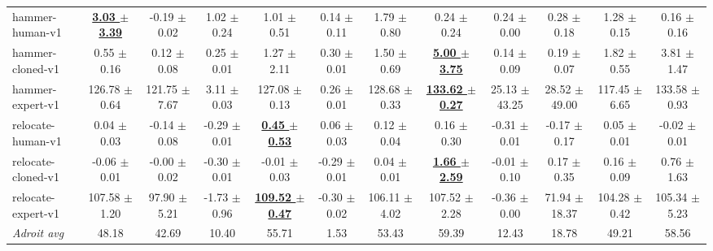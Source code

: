 \documentclass[a4paper]{article}
\begin{document}
\begin{table}[t]
{\begin{tabular}{lccccccccccc}
    hammer-human-v1 & \textbf{\underline{3.03 $\pm$ 3.39}} & -0.19 $\pm$ 0.02 & 1.02 $\pm$ 0.24 & 1.01 $\pm$ 0.51 & 0.14 $\pm$ 0.11 & 1.79 $\pm$ 0.80 & 0.24 $\pm$ 0.24 & 0.24 $\pm$ 0.00 & 0.28 $\pm$ 0.18 & 1.28 $\pm$ 0.15 & 0.16 $\pm$ 0.16 \\
    hammer-cloned-v1 & 0.55 $\pm$ 0.16 & 0.12 $\pm$ 0.08 & 0.25 $\pm$ 0.01 & 1.27 $\pm$ 2.11 & 0.30 $\pm$ 0.01 & 1.50 $\pm$ 0.69 & \textbf{\underline{5.00 $\pm$ 3.75}} & 0.14 $\pm$ 0.09 & 0.19 $\pm$ 0.07 & 1.82 $\pm$ 0.55 & 3.81 $\pm$ 1.47 \\
    hammer-expert-v1 & 126.78 $\pm$ 0.64 & 121.75 $\pm$ 7.67 & 3.11 $\pm$ 0.03 & 127.08 $\pm$ 0.13 & 0.26 $\pm$ 0.01 & 128.68 $\pm$ 0.33 & \textbf{\underline{133.62 $\pm$ 0.27}} & 25.13 $\pm$ 43.25 & 28.52 $\pm$ 49.00 & 117.45 $\pm$ 6.65 & 133.58 $\pm$ 0.93 \\
    relocate-human-v1 & 0.04 $\pm$ 0.03 & -0.14 $\pm$ 0.08 & -0.29 $\pm$ 0.01 & \textbf{\underline{0.45 $\pm$ 0.53}} & 0.06 $\pm$ 0.03 & 0.12 $\pm$ 0.04 & 0.16 $\pm$ 0.30 & -0.31 $\pm$ 0.01 & -0.17 $\pm$ 0.17 & 0.05 $\pm$ 0.01 & -0.02 $\pm$ 0.01 \\
    relocate-cloned-v1 & -0.06 $\pm$ 0.01 & -0.00 $\pm$ 0.02 & -0.30 $\pm$ 0.01 & -0.01 $\pm$ 0.03 & -0.29 $\pm$ 0.01 & 0.04 $\pm$ 0.01 & \textbf{\underline{1.66 $\pm$ 2.59}} & -0.01 $\pm$ 0.10 & 0.17 $\pm$ 0.35 & 0.16 $\pm$ 0.09 & 0.76 $\pm$ 1.63 \\
    relocate-expert-v1 & 107.58 $\pm$ 1.20 & 97.90 $\pm$ 5.21 & -1.73 $\pm$ 0.96 & \textbf{\underline{109.52 $\pm$ 0.47}} & -0.30 $\pm$ 0.02 & 106.11 $\pm$ 4.02 & 107.52 $\pm$ 2.28 & -0.36 $\pm$ 0.00 & 71.94 $\pm$ 18.37 & 104.28 $\pm$ 0.42 & 105.34 $\pm$ 5.23 \\
    \midrule
    \textit{Adroit avg} & 48.18 & 42.69 & 10.40 & 55.71 & 1.53 & 53.43 & 59.39 & 12.43 & 18.78 & 49.21 & 58.56 \\
    \bottomrule
  \end{tabular}
  }
\end{table}
\end{document}
